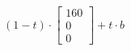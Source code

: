 \documentclass[preview]{standalone}
\begin{document}
\begin{align*}
(1- t ) \cdot \begin{bmatrix} 160 \\ 0 \\ 0 \end{bmatrix} + t \cdot b
\end{align*}
\end{document}
